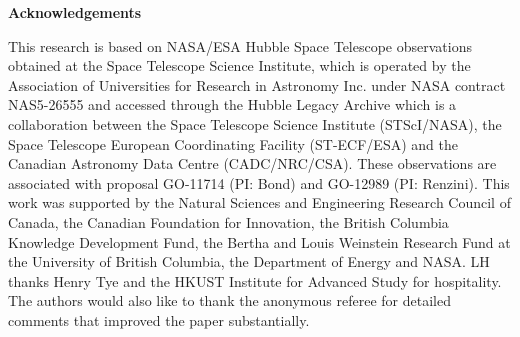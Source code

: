 \documentclass[useAMS,usenatbib]{mn2e}
\begin{document}
{\noindent \bf Acknowledgements}

This research is based on NASA/ESA Hubble Space Telescope observations
obtained at the Space Telescope Science Institute, which is operated
by the Association of Universities for Research in Astronomy
Inc. under NASA contract NAS5-26555 and accessed through the Hubble
Legacy Archive which is a collaboration between the Space Telescope
Science Institute (STScI/NASA), the Space Telescope European
Coordinating Facility (ST-ECF/ESA) and the Canadian Astronomy Data
Centre (CADC/NRC/CSA). These observations are associated with proposal
GO-11714 (PI: Bond) and GO-12989 (PI: Renzini).  This work was
supported by the Natural Sciences and Engineering Research Council of
Canada, the Canadian Foundation for Innovation, the British Columbia
Knowledge Development Fund, the Bertha and Louis Weinstein Research
Fund at the University of British Columbia, the Department of Energy
and NASA. LH thanks Henry Tye and the HKUST Institute for Advanced
Study for hospitality.  The authors would also like to thank the
anonymous referee for detailed comments that improved the paper
substantially.





\label{lastpage}
\end{document}
